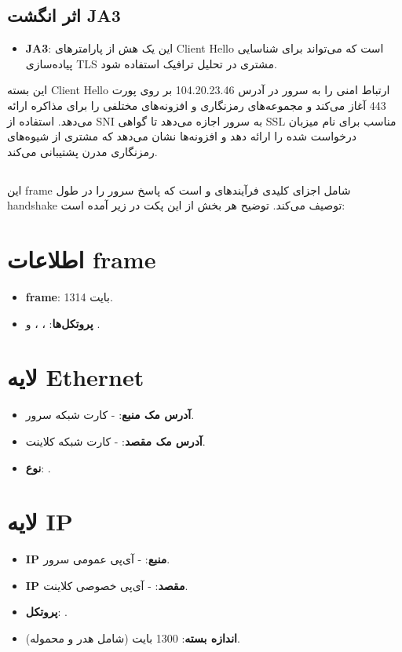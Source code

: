 \subsection*{اثر انگشت JA3}
\begin{itemize}[label={--}]
    \item \textbf{JA3}: این یک هش از پارامترهای Client Hello است که می‌تواند برای شناسایی پیاده‌سازی TLS مشتری در تحلیل ترافیک استفاده شود.
\end{itemize}
این بسته Client Hello ارتباط امنی را به سرور در آدرس 104.20.23.46 بر روی پورت 443 آغاز می‌کند و مجموعه‌های رمزنگاری و افزونه‌های مختلفی را برای مذاکره ارائه می‌دهد. استفاده از SNI به سرور اجازه می‌دهد تا گواهی SSL مناسب برای نام میزبان درخواست شده را ارائه دهد و افزونه‌ها نشان می‌دهد که مشتری از شیوه‌های رمزنگاری مدرن پشتیبانی می‌کند.
\subsection*{}
این frame شامل اجزای کلیدی فرآیندهای  و  است که پاسخ سرور را در طول handshake توصیف می‌کند. توضیح هر بخش از این پکت در زیر آمده است:

\section*{اطلاعات frame}
\begin{itemize}
    \item \textbf{frame}: 1314 بایت.
    \item \textbf{پروتکل‌ها}: ، ،  و .
\end{itemize}

\section*{لایه Ethernet}
\begin{itemize}
    \item \textbf{آدرس مک منبع}:  - کارت شبکه سرور.
    \item \textbf{آدرس مک مقصد}:  - کارت شبکه کلاینت.
    \item \textbf{نوع}: .
\end{itemize}

\section*{لایه IP}
\begin{itemize}
    \item \textbf{IP منبع}:  - آی‌پی عمومی سرور.
    \item \textbf{IP مقصد}:  - آی‌پی خصوصی کلاینت.
    \item \textbf{پروتکل}: .
    \item \textbf{اندازه بسته}: 1300 بایت (شامل هدر و محموله).
\end{itemize}

